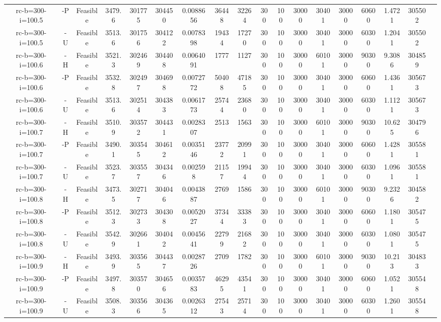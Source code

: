 \documentclass[landscape, a4paper]{article}
\begin{document}
\begin{center}
\begin{tabular}{@{}cccccccccccccccccc@{}}
rc-b=300-i=100.5 & -P & Feasible & 3479.6 & 301775 & 304450 & 0.0088656 & 36448 & 32264 & 300 & 100 & 30000 & 30401 & 30000 & 60600 & 1.4721 & 305502 & \\
rc-b=300-i=100.5 & -U & Feasible & 3513.6 & 301756 & 304122 & 0.0078398 & 19434 & 17270 & 300 & 100 & 30000 & 30401 & 30000 & 60300 & 1.2041 & 305502 & \\
rc-b=300-i=100.6 & -H & Feasible & 3521.3 & 302469 & 304408 & 0.0064091 & 1777 & 1127 & 300 & 100 & 30000 & 60101 & 30000 & 90300 & 9.3086 & 304859 & \\
rc-b=300-i=100.6 & -P & Feasible & 3532.8 & 302497 & 304698 & 0.0072772 & 50408 & 47185 & 300 & 100 & 30000 & 30401 & 30000 & 60600 & 1.4361 & 305673 & \\
rc-b=300-i=100.6 & -U & Feasible & 3513.6 & 302514 & 304383 & 0.0061773 & 25744 & 23680 & 300 & 100 & 30000 & 30401 & 30000 & 60300 & 1.1121 & 305673 & \\
rc-b=300-i=100.7 & -H & Feasible & 3510.9 & 303572 & 304431 & 0.0028307 & 2513 & 1563 & 300 & 100 & 30000 & 60101 & 30000 & 90300 & 10.625 & 304796 & \\
rc-b=300-i=100.7 & -P & Feasible & 3490.1 & 303545 & 304612 & 0.0035146 & 23772 & 20991 & 300 & 100 & 30000 & 30401 & 30000 & 60600 & 1.4281 & 305581 & \\
rc-b=300-i=100.7 & -U & Feasible & 3523.7 & 303557 & 304346 & 0.002598 & 21157 & 19944 & 300 & 100 & 30000 & 30401 & 30000 & 60300 & 1.0961 & 305581 & \\
rc-b=300-i=100.8 & -H & Feasible & 3473.5 & 302717 & 304046 & 0.0043887 & 2769 & 1586 & 300 & 100 & 30000 & 60101 & 30000 & 90300 & 9.2326 & 304582 & \\
rc-b=300-i=100.8 & -P & Feasible & 3512.3 & 302733 & 304308 & 0.0052027 & 37344 & 33383 & 300 & 100 & 30000 & 30401 & 30000 & 60600 & 1.1801 & 305475 & \\
rc-b=300-i=100.8 & -U & Feasible & 3542.9 & 302661 & 304042 & 0.0045641 & 22799 & 21682 & 300 & 100 & 30000 & 30401 & 30000 & 60300 & 1.0801 & 305475 & \\
rc-b=300-i=100.9 & -H & Feasible & 3493.9 & 303565 & 304437 & 0.0028726 & 2709 & 1782 & 300 & 100 & 30000 & 60101 & 30000 & 90300 & 10.213 & 304833 & \\
rc-b=300-i=100.9 & -P & Feasible & 3497.8 & 303570 & 304656 & 0.0035783 & 46295 & 43541 & 300 & 100 & 30000 & 30401 & 30000 & 60600 & 1.0521 & 305548 & \\
rc-b=300-i=100.9 & -U & Feasible & 3508.3 & 303566 & 304365 & 0.0026312 & 27543 & 25714 & 300 & 100 & 30000 & 30401 & 30000 & 60300 & 1.2601 & 305548 & \\
\end{tabular}
\end{center}
\end{document}
